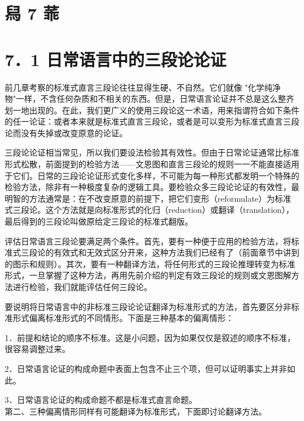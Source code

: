 \section*{舄 7 䓙}
\section*{7．1 日常语言中的三段论论证}
前几章考察的标准式直言三段论往往显得生硬、不自然。它们就像 "化学纯净物"一样，不含任何杂质和不相关的东西。但是，日常语言论证并不总是这么整齐划一地出现的。在此，我们更广义的使用三段论这一术语，用来指谓符合如下条件的任一论证：或者本来就是标准式直言三段论，或者是可以变形为标准式直言三段论而没有失掉或改变原意的论证。

三段论论证相当常见，所以我们要设法检验其有效性。但由于日常论证通常比标准形式松散，前面提到的检验方法——文恩图和直言三段论的规则一一不能直接适用于它们。日常的三段论论证形式变化多样，不可能为每一种形式都发明一个特殊的检验方法，除非有一种极度复杂的逻辑工具。要检验众多三段论论证的有效性，最明智的方法通常是：在不改变原意的前提下，把它们变形（reformulate）为标准式三段论。这个方法就是向标准形式的化归（reduction）或翻译（translation），最后得到的三段论叫做原给定三段论的标准式翻版。

评估日常语言三段论要满足两个条件。首先，要有一种便于应用的检验方法，将标准式三段论的有效式和无效式区分开来，这种方法我们已经有了（前面章节中讲到的图示和规则）。其次，要有一种翻译方法，将任何形式的三段论推理转变为标准形式，一旦掌握了这种方法，再用先前介绍的判定有效三段论的规则或文恩图解方法进行检验，我们就能评估任何三段论。

要说明将日常语言中的非标准三段论论证翻译为标准形式的方法，首先要区分非标准形式偏离标准形式的不同情形。下面是三种基本的偏离情形：

1．前提和结论的顺序不标准。这是小问题，因为如果仅仅是叙述的顺序不标准，很容易调整过来。

2．日常语言论证的构成命题中表面上包含不止三个项，但可以证明事实上并非如此。

3．日常语言论证的构成命题不都是标准式直言命题。\\
第二、三种偏离情形同样有可能翻译为标准形式，下面即讨论翻译方法。 